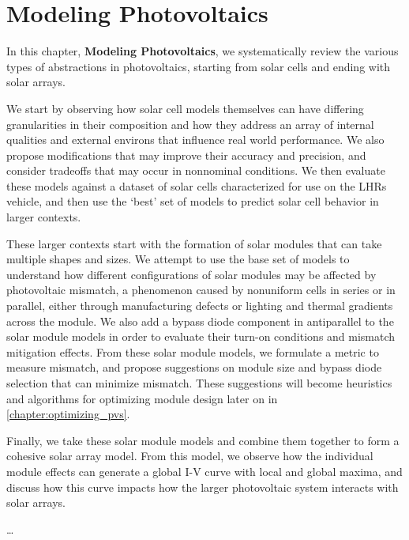 \chapter{Modeling Photovoltaics}\label{chapter:modeling_pvs}

In this chapter, \textbf{Modeling Photovoltaics}, we systematically review the
various types of abstractions in photovoltaics, starting from solar cells and
ending with solar arrays.

We start by observing how solar cell models themselves can have differing
granularities in their composition and how they address an array of internal
qualities and external environs that influence real world performance. We also
propose modifications that may improve their accuracy and precision, and
consider tradeoffs that may occur in nonnominal conditions. We then evaluate
these models against a dataset of solar cells characterized for use on the
\ac{LHRs} vehicle, and then use the `best' set of models to predict solar cell
behavior in larger contexts.

These larger contexts start with the formation of solar modules that can take
multiple shapes and sizes. We attempt to use the base set of models to
understand how different configurations of solar modules may be affected by
photovoltaic mismatch, a phenomenon caused by nonuniform cells in series or in
parallel, either through manufacturing defects or lighting and thermal
gradients across the module. We also add a bypass diode component in
antiparallel to the solar module models in order to evaluate their turn-on
conditions and mismatch mitigation effects. From these solar module models, we
formulate a metric to measure mismatch, and propose suggestions on module size
and bypass diode selection that can minimize mismatch. These suggestions will
become heuristics and algorithms for optimizing module design later on in
\autoref{chapter:optimizing_pvs}.

Finally, we take these solar module models and combine them together to form a
cohesive solar array model. From this model, we observe how the individual
module effects can generate a global \ac{I-V} curve with local and global
maxima, and discuss how this curve impacts how the larger photovoltaic system
interacts with solar arrays.

\newpage

\newpage

\newpage

\newpage

\newpage

\newpage

\newpage

\newpage


\dots
